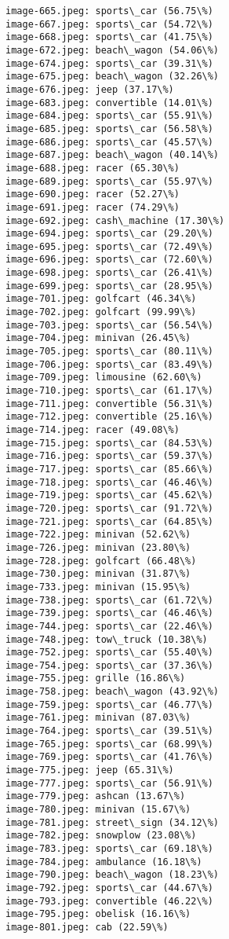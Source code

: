 \documentclass[11pt]{article}
\begin{document}
\begin{Verbatim}[commandchars=\\\{\}]
image-665.jpeg: sports\_car (56.75\%)
image-667.jpeg: sports\_car (54.72\%)
image-668.jpeg: sports\_car (41.75\%)
image-672.jpeg: beach\_wagon (54.06\%)
image-674.jpeg: sports\_car (39.31\%)
image-675.jpeg: beach\_wagon (32.26\%)
image-676.jpeg: jeep (37.17\%)
image-683.jpeg: convertible (14.01\%)
image-684.jpeg: sports\_car (55.91\%)
image-685.jpeg: sports\_car (56.58\%)
image-686.jpeg: sports\_car (45.57\%)
image-687.jpeg: beach\_wagon (40.14\%)
image-688.jpeg: racer (65.30\%)
image-689.jpeg: sports\_car (55.97\%)
image-690.jpeg: racer (52.27\%)
image-691.jpeg: racer (74.29\%)
image-692.jpeg: cash\_machine (17.30\%)
image-694.jpeg: sports\_car (29.20\%)
image-695.jpeg: sports\_car (72.49\%)
image-696.jpeg: sports\_car (72.60\%)
image-698.jpeg: sports\_car (26.41\%)
image-699.jpeg: sports\_car (28.95\%)
image-701.jpeg: golfcart (46.34\%)
image-702.jpeg: golfcart (99.99\%)
image-703.jpeg: sports\_car (56.54\%)
image-704.jpeg: minivan (26.45\%)
image-705.jpeg: sports\_car (80.11\%)
image-706.jpeg: sports\_car (83.49\%)
image-709.jpeg: limousine (62.60\%)
image-710.jpeg: sports\_car (61.17\%)
image-711.jpeg: convertible (56.31\%)
image-712.jpeg: convertible (25.16\%)
image-714.jpeg: racer (49.08\%)
image-715.jpeg: sports\_car (84.53\%)
image-716.jpeg: sports\_car (59.37\%)
image-717.jpeg: sports\_car (85.66\%)
image-718.jpeg: sports\_car (46.46\%)
image-719.jpeg: sports\_car (45.62\%)
image-720.jpeg: sports\_car (91.72\%)
image-721.jpeg: sports\_car (64.85\%)
image-722.jpeg: minivan (52.62\%)
image-726.jpeg: minivan (23.80\%)
image-728.jpeg: golfcart (66.48\%)
image-730.jpeg: minivan (31.87\%)
image-733.jpeg: minivan (15.95\%)
image-738.jpeg: sports\_car (61.72\%)
image-739.jpeg: sports\_car (46.46\%)
image-744.jpeg: sports\_car (22.46\%)
image-748.jpeg: tow\_truck (10.38\%)
image-752.jpeg: sports\_car (55.40\%)
image-754.jpeg: sports\_car (37.36\%)
image-755.jpeg: grille (16.86\%)
image-758.jpeg: beach\_wagon (43.92\%)
image-759.jpeg: sports\_car (46.77\%)
image-761.jpeg: minivan (87.03\%)
image-764.jpeg: sports\_car (39.51\%)
image-765.jpeg: sports\_car (68.99\%)
image-769.jpeg: sports\_car (41.76\%)
image-775.jpeg: jeep (65.31\%)
image-777.jpeg: sports\_car (56.91\%)
image-779.jpeg: ashcan (13.67\%)
image-780.jpeg: minivan (15.67\%)
image-781.jpeg: street\_sign (34.12\%)
image-782.jpeg: snowplow (23.08\%)
image-783.jpeg: sports\_car (69.18\%)
image-784.jpeg: ambulance (16.18\%)
image-790.jpeg: beach\_wagon (18.23\%)
image-792.jpeg: sports\_car (44.67\%)
image-793.jpeg: convertible (46.22\%)
image-795.jpeg: obelisk (16.16\%)
image-801.jpeg: cab (22.59\%)
    \end{Verbatim}
\end{document}
